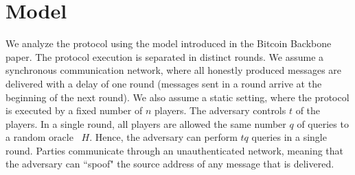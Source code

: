 \section{Model}

We analyze the protocol using the model introduced in the Bitcoin Backbone~\cite{backbone} paper.
The protocol execution is separated in distinct rounds.
We assume a synchronous communication network, where all honestly produced
messages are delivered with a delay of one round (messages sent in a round
arrive at the beginning of the next round).
We also assume a static setting, where the protocol is executed by
a fixed number of $n$ players.
The adversary controls $t$ of the players.
In a single round, all players are allowed the same number $q$ of queries to
a random oracle~\cite{ro} $H$. Hence, the adversary can perform $t q$ queries
in a single round.
Parties communicate through an unauthenticated network,
meaning that the adversary can ``spoof"
the source address of any message that is delivered.

